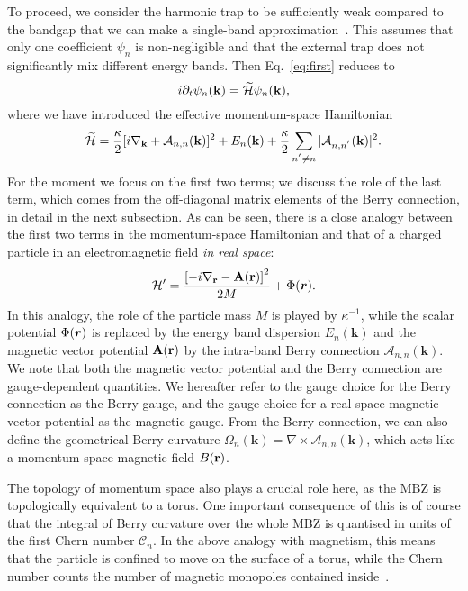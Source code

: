 To proceed, we consider the harmonic trap to be sufficiently weak
compared to the bandgap that we can make a single-band
approximation~\cite{price2014magnetic}. This assumes that only one
coefficient $\psi_n$ is non-negligible and that the external trap does
not significantly mix different energy bands. Then Eq.~\eqref{eq:first}
reduces to
%
\begin{equation} i \partial_t \psi_n(\mathbf{k}) = \widetilde{\mathcal{H}}
\psi_n(\mathbf{k}) ,
\end{equation} where we have introduced the effective momentum-space
Hamiltonian
%
\begin{equation}\label{eq:dual} \widetilde{\mathcal{H}} =
\frac{\kappa}{2} [i\nabla_{\mathbf{k}} + \mathcal{A}_{n,
n}(\mathbf{k})]^2 + E_n(\mathbf{k}) + \frac{\kappa}{2}\sum_{n^{'}\neq
n} \vert \mathcal{A}_{n,n^{'}}(\mathbf{k}) \vert^2.
\end{equation}
%
For the moment we focus on the first two terms; we discuss the role of
the last term, which comes from the off-diagonal matrix elements of
the Berry connection, in detail in the next subsection.  As can be
seen, there is a close analogy between the first two terms in the
momentum-space Hamiltonian and that of a charged particle in an
electromagnetic field {\em in real space}:
%
\begin{equation}\label{eq:mag} \mathcal{H}'=
\frac{\left[-i\nabla_{\mathbf{r}} - \mathbf{A}(\mathbf{r})\right]^2}{2M} +
\Phi(\bm{r}).
\end{equation}
%
In this analogy, the role of the particle mass $M$ is played by
$\kappa^{-1}$, while the scalar potential $ \Phi(\bm{r})$ is replaced by
the energy band dispersion $E_n(\mathbf{k})$ and the magnetic vector
potential $\mathbf{A}(\mathbf{r})$ by the intra-band Berry connection
$\mathcal{A}_{n, n}(\mathbf{k})$. We note that both the magnetic
vector potential and the Berry connection are gauge-dependent
quantities. We hereafter refer to the gauge choice for the Berry
connection as the Berry gauge, and the gauge choice for a real-space
magnetic vector potential as the magnetic gauge. From the Berry
connection, we can also define the geometrical Berry curvature
$\Omega_{n}(\mathbf{k}) =\nabla \times \mathcal{A}_{n,
n}(\mathbf{k})$, which acts like a momentum-space magnetic field
$B(\mathbf{r})$.

The topology of momentum space also plays a crucial role here, as the
MBZ is topologically equivalent to a torus. One important consequence
of this is of course that the integral of Berry curvature over the
whole MBZ is quantised in units of the first Chern number
$\mathcal{C}_n$. In the above analogy with magnetism, this means that
the particle is confined to move on the surface of a torus, while the
Chern number counts the number of magnetic monopoles contained
inside~\cite{Fang}.

